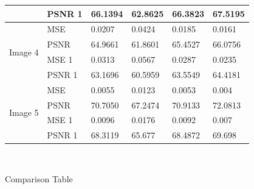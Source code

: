 \begin{center}
\begin{tabular}{|l|l|l|l|l|l|l|l|l|l|}
                         & PSNR 1 & \multicolumn{2}{l|}{66.1394} & \multicolumn{2}{l|}{62.8625} & \multicolumn{2}{l|}{66.3823}  & \multicolumn{2}{l|}{67.5195} \\ \hline
\multirow{4}{*}{Image 4} & MSE    & \multicolumn{2}{l|}{0.0207}  & \multicolumn{2}{l|}{0.0424}  & \multicolumn{2}{l|}{0.0185}   & \multicolumn{2}{l|}{0.0161}  \\ \cline{2-10} 
                         & PSNR   & \multicolumn{2}{l|}{64.9661} & \multicolumn{2}{l|}{61.8601} & \multicolumn{2}{l|}{65.4527}  & \multicolumn{2}{l|}{66.0756} \\ \cline{2-10} 
                         & MSE 1  & \multicolumn{2}{l|}{0.0313}  & \multicolumn{2}{l|}{0.0567}  & \multicolumn{2}{l|}{0.0287}   & \multicolumn{2}{l|}{0.0235}  \\ \cline{2-10} 
                         & PSNR 1 & \multicolumn{2}{l|}{63.1696} & \multicolumn{2}{l|}{60.5959} & \multicolumn{2}{l|}{63.5549}  & \multicolumn{2}{l|}{64.4181} \\ \hline
\multirow{4}{*}{Image 5} & MSE    & \multicolumn{2}{l|}{0.0055}  & \multicolumn{2}{l|}{0.0123}  & \multicolumn{2}{l|}{0.0053}   & \multicolumn{2}{l|}{0.004}   \\ \cline{2-10} 
                         & PSNR   & \multicolumn{2}{l|}{70.7050} & \multicolumn{2}{l|}{67.2474} & \multicolumn{2}{l|}{70.9133}  & \multicolumn{2}{l|}{72.0813} \\ \cline{2-10} 
                         & MSE 1  & \multicolumn{2}{l|}{0.0096}  & \multicolumn{2}{l|}{0.0176}  & \multicolumn{2}{l|}{0.0092}   & \multicolumn{2}{l|}{0.007}   \\ \cline{2-10} 
                         & PSNR 1 & \multicolumn{2}{l|}{68.3119} & \multicolumn{2}{l|}{65.677}  & \multicolumn{2}{l|}{68.4872}  & \multicolumn{2}{l|}{69.698}  \\ \hline
\end{tabular}
	
	\
	
	Comparison Table
\end{center}

\newpage
